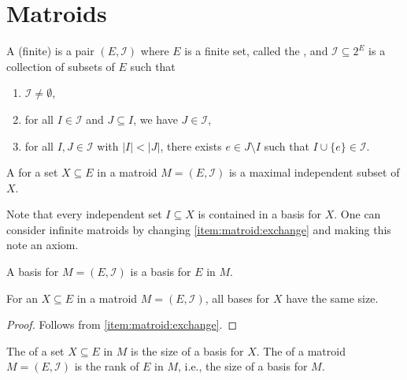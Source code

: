 \chapter{Matroids}

\begin{definition}[Matroid]
    A (finite)  is a pair \( (E, \mathcal{I}) \) where
    \(E\) is a finite set, called the , and
    \(\mathcal{I} \subseteq 2^E\) is a collection of subsets of \(E\) such that
    \begin{enumerate}[label = \textup{(I\arabic*)}]
        \item \(\mathcal{I} \neq \emptyset\), \label{item:matroid:nonempty}
        \item for all \(I \in \mathcal{I}\) and \(J \subseteq I\), we have \(J \in \mathcal{I}\), \label{item:matroid:hereditary}
        \item for all \(I, J \in \mathcal{I}\) with \(|I| < |J|\), there exists \(e \in J \setminus I\) such that \(I \cup \{e\} \in \mathcal{I}\). \label{item:matroid:exchange}
    \end{enumerate}
\end{definition}

\begin{definition}[Basis]
    A  for a set \(X \subseteq E\) in a matroid \(M = (E, \mathcal{I})\) is a maximal independent subset of \(X\).
\end{definition}

Note that every independent set \(I \subseteq X\) is contained in a basis for \(X\).
One can consider infinite matroids by changing \ref{item:matroid:exchange} and making this note an axiom.

A basis for \(M = (E, \mathcal{I})\) is a basis for \(E\) in \(M\).

\begin{proposition}
    For an \(X \subseteq E\) in a matroid \(M = (E, \mathcal{I})\), all bases for \(X\) have the same size.
\end{proposition}

\begin{proof}
    Follows from \ref{item:matroid:exchange}.
\end{proof}

\begin{definition}[Rank]
    The  of a set \(X \subseteq E\) in \(M\) is the size of a basis for \(X\).
    The  of a matroid \(M = (E, \mathcal{I})\) is the rank of \(E\) in \(M\), i.e., the size of a basis for \(M\).
\end{definition}

